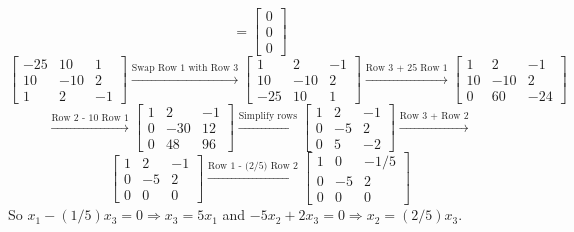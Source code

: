 \begin{enumerate}[label=(\alph*)]
\[                =
                \begin{bmatrix}
                    0 \\
                    0 \\
                    0
                \end{bmatrix}
            \]
            \[
                \begin{bmatrix}
                    -25 & 10 & 1 \\
                    10 & -10 & 2 \\
                    1 & 2 & -1
                \end{bmatrix}
                \overset{\text{Swap Row 1 with Row 3}}{\longrightarrow}
                \begin{bmatrix}
                    1 & 2 & -1 \\
                    10 & -10 & 2 \\
                    -25 & 10 & 1
                \end{bmatrix}
                \overset{\text{Row 3 + 25 Row 1}}{\longrightarrow}
                \begin{bmatrix}
                    1 & 2 & -1 \\
                    10 & -10 & 2 \\
                    0 & 60 & -24
                \end{bmatrix}
            \]
            \[
                \overset{\text{Row 2 - 10 Row 1}}{\longrightarrow}
                \begin{bmatrix}
                    1 & 2 & -1 \\
                    0 & -30 & 12 \\
                    0 & 48 & 96
                \end{bmatrix}
                \overset{\text{Simplify rows}}{\longrightarrow}
                \begin{bmatrix}
                    1 & 2 & -1 \\
                    0 & -5 & 2 \\
                    0 & 5 & -2
                \end{bmatrix}
                \overset{\text{Row 3 + Row 2}}{\longrightarrow}
            \]
            \[
                \begin{bmatrix}
                    1 & 2 & -1 \\
                    0 & -5 & 2 \\
                    0 & 0 & 0
                \end{bmatrix}
                \overset{\text{Row 1 - (2/5) Row 2}}{\longrightarrow}
                \begin{bmatrix}
                    1 & 0 & -1/5 \\
                    0 & -5 & 2 \\
                    0 & 0 & 0
                \end{bmatrix}
            \]
            So $x_1 - (1/5)x_3 = 0 \Rightarrow x_3 = 5x_1$
            and $-5x_2 + 2x_3 = 0 \Rightarrow x_2 = (2/5)x_3$.


\end{enumerate}
